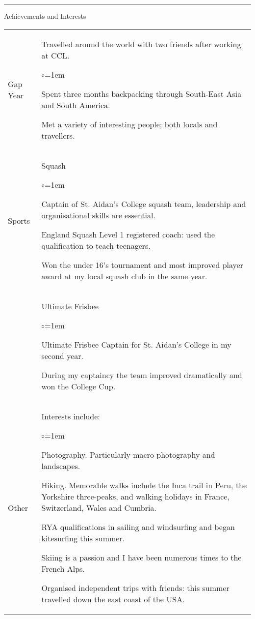 \documentclass[11pt,a4paper]{article}
\makeatletter
\renewcommand{\labelitemi}{$\circ$}
\newcommand{\wa}{.12}	%
\newcommand{\wb}{.83}	%
\renewcommand{\headrulewidth}{.mm}
\newenvironment{tablehere}
	{\def\@captype{table}}
	{}
\makeatother
\begin{document}
\hrule\vspace{0.2cm}
\sc Achievements and Interests\rm
{}

\begin{tablehere}
\begin{tabular}{p{\wa\textwidth} p{\wb\textwidth}}
	\sc Gap Year	&	Travelled around the world with two friends after working at CCL.
					\begin{list}	{\labelitemi}{\leftmargin=1em}			
					\item Spent three months backpacking through South-East Asia and South America.
					\item Met a variety of interesting people; both locals and travellers.
					\end{list}\\	
	\sc Sports		&	{\sc Squash}
					\begin{list}{\labelitemi}{\leftmargin=1em}
					\item Captain of St$.$ Aidan's College squash team, leadership and organisational skills are essential. 
					\item England Squash Level 1 registered coach: used the qualification to teach teenagers.
					\item Won the under 16's tournament and most improved player award at my local squash club in the same year.
					\end{list}\\
				&	{\sc Ultimate Frisbee}
					\begin{list}{\labelitemi}{\leftmargin=1em}
					\item Ultimate Frisbee Captain for St$.$ Aidan's College in my second year.
					\item During my captaincy the team improved dramatically and won the College Cup.
					\end{list}\\
	\sc Other		&	Interests include:
					\begin{list}{\labelitemi}{\leftmargin=1em}
					\item Photography.  Particularly macro photography and landscapes.
					\item Hiking.  Memorable walks include the Inca trail in Peru, the Yorkshire three-peaks, and walking holidays in France, Switzerland, Wales and Cumbria.
					\item RYA qualifications in sailing and windsurfing and began kitesurfing this summer.
					\item Skiing is a passion and I have been numerous times to the French Alps.
					\item Organised independent trips with friends: this summer travelled down the east coast of the USA.
					\end{list}\\
\end{tabular}
\end{tablehere}
\end{document}
